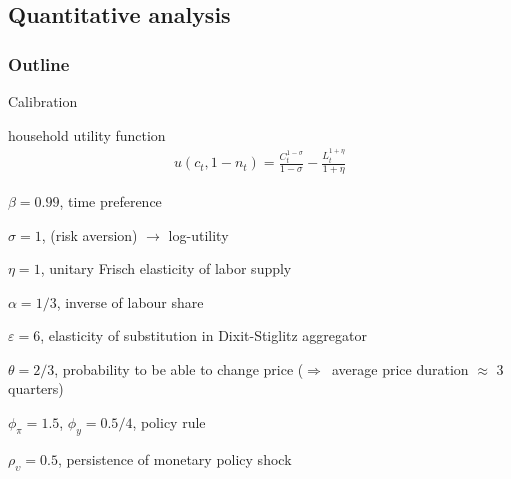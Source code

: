 \documentclass{beamer}
\newenvironment{mytemize}
{\vfill\itemize[nolistsep,itemsep=\fill,label=\color{blue}{$\triangleright$}]}
  {\enditemize}
\newcommand{\rarr}{$\Rightarrow$\ }
\begin{document}
\subsection{Quantitative analysis}
\begin{frame}
\frametitle{Outline}
\tableofcontents[currentsubsection]
\end{frame}
\begin{frame}{Calibration}

{
\small
household utility function
\begin{align*}
u(c_t,1-n_t) = \frac{C_t^{1-\sigma}}{1-\sigma}-\frac{L_t^{1+\eta}}{1+\eta}
\end{align*}
\begin{mytemize}
\small
\item $\beta=0.99$, time preference
\item $\sigma=1$, (risk aversion) $\rightarrow$ log-utility
\item $\eta=1$, unitary Frisch elasticity of labor supply 
\item $\alpha=1/3$, inverse of labour share
\item $\varepsilon=6$, elasticity of substitution in Dixit-Stiglitz aggregator
\item $\theta = 2/3$, probability to be able to change price (\rarr average price duration $\approx$ 3 quarters)
\item $\phi_{\pi}=1.5$, $\phi_{y}=0.5/4$, policy rule
\item $\rho_{\upsilon}=0.5$, persistence of monetary policy shock
\end{mytemize}
}

\end{frame}
\end{document}
